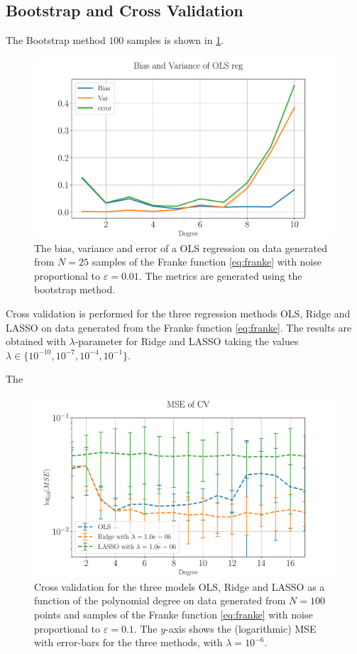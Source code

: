 \documentclass[%
reprint,
amsmath,amssymb,
aps,
pra,
]{revtex4-2}
\begin{document}
\subsection{Bootstrap and Cross Validation}
The Bootstrap method \(100\) samples is shown in \ref{fig:bootstrap}.
\begin{figure}[ht!]
	\centering
	\includegraphics[width=\linewidth]{Python/Figures/OLS/OLS_Bootstrap_BiasVar_no_scaling_GOOD.pdf}
	\caption{The bias, variance and error of a OLS regression on data generated from \(N=25\) samples of the Franke function \eqref{eq:franke} with noise proportional to \(\varepsilon=0.01\). The metrics are generated using the bootstrap method.}
	\label{fig:bootstrap}
\end{figure}

Cross validation is performed for the three regression methods OLS, Ridge and LASSO on data generated from the Franke function \eqref{eq:franke}. The results are obtained with \(\lambda\)-parameter for Ridge and LASSO taking the values \(\lambda \in\{ 10^{-10}, 10^{-7}, 10^{-4}, 10^{-1}\}\).

The 
\begin{figure}[ht!]
	\centering
	\includegraphics[width=\linewidth]{Python/Figures/CV/CV_no_scaling.pdf}
	\caption{Cross validation for the three models OLS, Ridge and LASSO as a function of the polynomial degree on data generated from \(N=100\) points and samples of the Franke function \eqref{eq:franke} with noise proportional to \(\varepsilon=0.1\). The $y$-axis shows the (logarithmic) MSE with error-bars for the three methods, with \(\lambda=10^{-6}\). }
	\label{fig:CV}
\end{figure}
\end{document}
